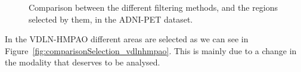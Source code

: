 \begin{figure}[bth]
	\caption[Comparison between the different filtering methods in ADNI-PET.]{Comparison between the different filtering methods, and the regions selected by them, in the ADNI-PET dataset. }\label{fig:comparisonSelection_adnipet}
\end{figure}

In the VDLN-HMPAO different areas are selected as we can see in Figure~\ref{fig:comparisonSelection_vdlnhmpao}. This is mainly due to a change in the modality that deserves to be analysed. 

\begin{figure}[bth]
	\myfloatalign
	\quad
	\subfloat[\ac{KL} divergence.]

\end{figure}
